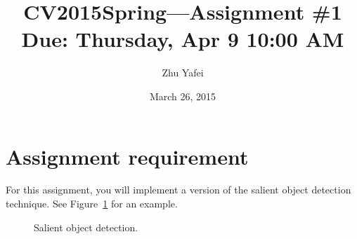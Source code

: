 \documentclass[12pt]{article}
\begin{document}
\title{\vspace{-2em}CV2015Spring---Assignment \#\textbf{1}\\
\normalsize{Due: Thursday, Apr 9 10:00 AM}}
\author{Zhu Yafei}
\date{\vspace{-0.7em}March 26, 2015\vspace{-0.7em}}
\maketitle\thispagestyle{fancy}
\maketitle


\section{Assignment requirement}

For this assignment, you will implement a version of the salient object detection technique. See Figure~\ref{fig: result} for an example.

\begin{figure}[!ht]
  \centering 
  \caption{Salient object detection.}
  \label{fig: result} %
\end{figure}
\end{document}
